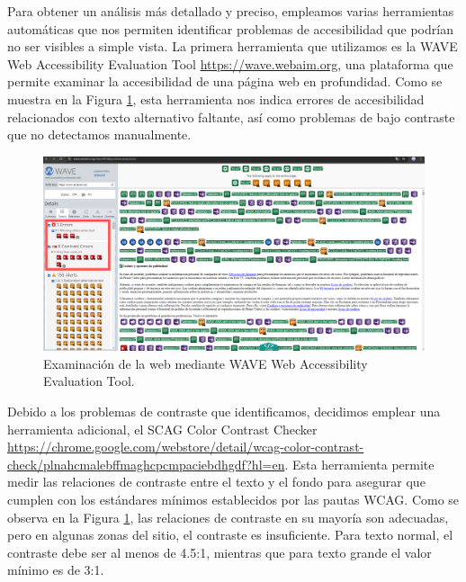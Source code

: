 \documentclass[letterpaper, 12pt]{report}
\begin{document}
Para obtener un análisis más detallado y preciso, empleamos varias herramientas automáticas que nos permiten identificar problemas de accesibilidad que podrían no ser visibles a simple vista. La primera herramienta que utilizamos es la WAVE Web Accessibility Evaluation Tool \url{https://wave.webaim.org}, una plataforma que permite examinar la accesibilidad de una página web en profundidad. Como se muestra en la Figura \ref{fig:18}, esta herramienta nos indica errores de accesibilidad relacionados con texto alternativo faltante, así como problemas de bajo contraste que no detectamos manualmente.

\begin{figure}[H]
\centering
\includegraphics[width=1\textwidth]{figure18.png}
\caption{Examinación de la web mediante WAVE Web Accessibility Evaluation Tool.}
\label{fig:18}
\end{figure}

Debido a los problemas de contraste que identificamos, decidimos emplear una herramienta adicional, el SCAG Color Contrast Checker \url{https://chrome.google.com/webstore/detail/wcag-color-contrast-check/plnahcmalebffmaghcpcmpaciebdhgdf?hl=en}. Esta herramienta permite medir las relaciones de contraste entre el texto y el fondo para asegurar que cumplen con los estándares mínimos establecidos por las pautas WCAG. Como se observa en la Figura \ref{fig:18}, las relaciones de contraste en su mayoría son adecuadas, pero en algunas zonas del sitio, el contraste es insuficiente. Para texto normal, el contraste debe ser al menos de 4.5:1, mientras que para texto grande el valor mínimo es de 3:1.
\end{document}
